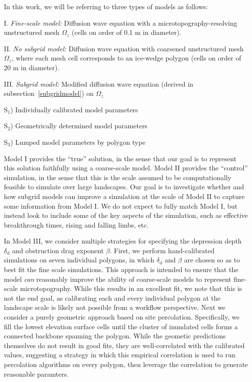 \documentclass[review,11pt]{elsarticle}
\begin{document}
In this work, we will be referring to three types of models as follows:
%
\begin{description}\itemsep0pt \parskip0pt
\item I. \emph{Fine-scale model:} Diffusion wave equation with a microtopography-resolving unstructured mesh $\Omega_z$ (cells on order of 0.1 m in diameter). 
\item II. \emph{No subgrid model:} Diffusion wave equation with coarsened unstructured mesh $\Omega_{\bar{z}}$, where each mesh cell corresponds to an ice-wedge polygon (cells on order of 20 m in diameter).
\item III. \emph{Subgrid model:} Modified diffusion wave equation (derived in subsection~\ref{subgridmodel}) on $\Omega_{\bar{z}}$
  \begin{description}
  \item S$_1$) Individually calibrated model parameters
  \item S$_2$) Geometrically determined model parameters
  \item S$_3$) Lumped model parameters by polygon type
  \end{description}
\end{description}
%
Model I provides the ``true'' solution, in the sense that our goal is to represent this solution faithfully using a coarse-scale model.
Model II provides the ``control'' simulation, in the sense that this is the scale assumed to be computationally feasible to simulate over large landscapes.
Our goal is to investigate whether and how subgrid models can improve a simulation at the scale of Model II to capture some information from Model I.
We do not expect to fully match Model I, but instead look to include some of the key aspects of the simulation, such as effective breakthrough times, rising and falling limbs, etc.

In Model III, we consider multiple strategies for specifying the depression depth $\delta_\text{d}$ and obstruction drag exponent $\beta$.
First, we perform hand-calibrated simulations on seven individual polygons, in which $\delta_\text{d}$ and $\beta$ are chosen so as to best fit the fine scale simulations.
This approach is intended to ensure that the model \emph{can} reasonably improve the ability of coarse-scale models to represent fine-scale microtopography.
While this results in an excellent fit, we note that this is not the end goal, as calibrating each and every individual polygon at the landscape scale is likely not possible from a workflow perspective.
Next we consider a purely geometric approach based on site percolation.
Specifically, we fill the lowest elevation surface cells until the cluster of inundated cells forms a connected backbone spanning the polygon.
While the geometic predictions themselves do not result in good fits, they are well-correlated with the calibrated values, suggesting a strategy in which this empirical correlation is used to run percolation algorithms on every polygon, then leverage the correlation to generate reasonable paramters.
\end{document}
